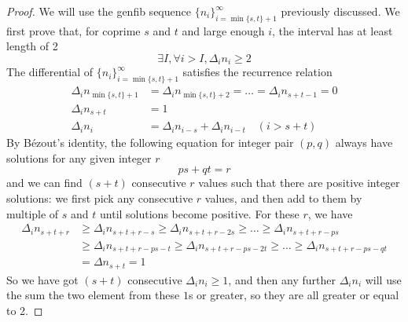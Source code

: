 \documentclass[]{article}
\begin{document}
\begin{proof}
	
	We will use the genfib sequence $\{n_i\}_{i=\min\{s,t\}+1}^{\infty}$ previously discussed. We first prove that, for coprime $s$ and $t$ and large enough $i$, the interval has at least length of 2
	\[
	\exists I, \forall i>I, \Delta_i n_{i} \ge 2
	\]
	The differential of $\{n_i\}_{i=\min\{s,t\}+1}^{\infty}$ satisfies the recurrence relation
	\begin{align*}
	\Delta_i n_{\min\{s,t\}+1} &= \Delta_i n_{\min\{s,t\}+2} = \dots = \Delta_i n_{s+t-1} = 0\\
	\Delta_i n_{s+t} &= 1\\
	\Delta_i n_i &= \Delta_i n_{i-s} + \Delta_i n_{i-t} \quad (i > s + t)
	\end{align*}
	By Bézout's identity, the following equation for integer pair $(p, q)$ always have solutions for any given integer $r$
	\[
	ps + qt = r
	\]
	and we can find $(s + t)$ consecutive $r$ values such that there are positive integer solutions: we first pick any consecutive $r$ values, and then add to them by multiple of $s$ and $t$ until solutions become positive. For these $r$, we have
	\begin{align*}
	\Delta_i n_{s+t+r} &\geq \Delta_i n_{s+t+r - s} \geq \Delta_i n_{s+t+r - 2s} \geq\dots \geq \Delta_i  n_{s+t+r - ps} \\
		&\geq \Delta_i n_{s+t+r - ps - t} \geq \Delta_i n_{s+t+r - ps - 2t} \geq\dots \geq \Delta_i  n_{s+t+r - ps - qt} \\ 
		&= \Delta n_{s+t} = 1
	\end{align*}
	So we have got $(s + t)$ consecutive $\Delta_i n_i\geq 1$, and then any further $\Delta_i n_i$ will use the sum the two element from these $1$s or greater, so they are all greater or equal to 2.
	

\end{proof}
\end{document}
